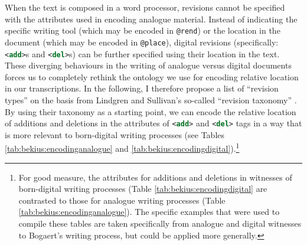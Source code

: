 \begin{paper}
When the text is composed in a word processor, revisions cannot be
specified with the attributes used in encoding analogue material.
Instead of indicating the specific writing tool (which may be encoded in \lstinline[language=XML]!@rend!) or the location
in the document (which may be encoded in \lstinline[language=XML]!@place!), digital revisions
(specifically: \lstinline[language=XML]!<add>!s and \lstinline[language=XML]!<del>!s) can be further
specified using their location in the text. These diverging behaviours in the writing of analogue versus digital documents forces us to completely rethink the ontology we use for encoding relative location in our transcriptions. In the following, I therefore propose a list of ``revision types'' on the basis from Lindgren and Sullivan's so-called ``revision taxonomy'' \citeyearpar{lindgren_analysing_2006}. By using their taxonomy as a starting point, we can encode the relative location of additions and deletions in the attributes of \lstinline[language=XML]!<add>! and \lstinline[language=XML]!<del>! tags in a way that is more relevant to born-digital writing processes (see Tables \ref{tab:bekius:encodinganalogue} and \ref{tab:bekius:encodingdigital}).\footnote{For good measure, the attributes for additions and deletions in witnesses of born-digital writing processes (Table \ref{tab:bekius:encodingdigital} are contrasted to those for analogue writing processes (Table \ref{tab:bekius:encodinganalogue}). The specific examples that were used to compile these tables are taken specifically from analogue and digital witnesses to Bogaert's writing process, but could be applied more generally.} 


\end{paper}
